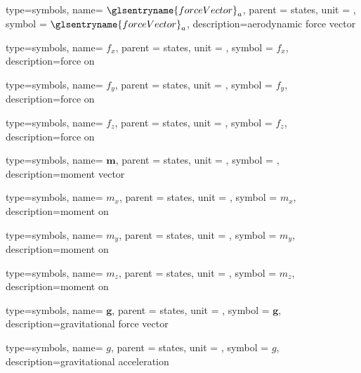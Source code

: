 {type=symbols,
  name= \ensuremath{{\glsentryname{forceVector}}_{a}},
  parent = {states},
  unit = \unexpanded{},
  symbol = \ensuremath{{\glsentryname{forceVector}}_{a}},
  description={aerodynamic force vector}
}

{type=symbols,
  name= \ensuremath{f_{x}},
  parent = {states},
  unit = \unexpanded{\si{\newton}},
  symbol = \ensuremath{f_{x}},
  description={force on }
}

{type=symbols,
  name= \ensuremath{f_{y}},
  parent = {states},
  unit = \unexpanded{\si{\newton}},
  symbol = \ensuremath{f_{y}},
  description={force on }
}

{type=symbols,
  name= \ensuremath{f_{z}},
  parent = {states},
  unit = \unexpanded{\si{\newton}},
  symbol = \ensuremath{f_{z}},
  description={force on }
}


{type=symbols,
  name= \ensuremath{\mathbf{m}},
  parent = {states},
  unit = \unexpanded{},
  symbol = ,
  description={moment vector}
}

{type=symbols,
  name= \ensuremath{m_{x}},
  parent = {states},
  unit = \unexpanded{\si{\newton\meter}},
  symbol = \ensuremath{m_{x}},
  description={moment on }
}

{type=symbols,
  name= \ensuremath{m_{y}},
  parent = {states},
  unit = \unexpanded{\si{\newton\meter}},
  symbol = \ensuremath{m_{y}},
  description={moment on }
}

{type=symbols,
  name= \ensuremath{m_{z}},
  parent = {states},
  unit = \unexpanded{\si{\newton\meter}},
  symbol = \ensuremath{m_{z}},
  description={moment on }
}

{type=symbols,
  name= \ensuremath{\mathbf{g}},
  parent = {states},
  unit = \unexpanded{},
  symbol = \ensuremath{\mathbf{g}},
  description={gravitational force vector}
}

{type=symbols,
  name= \ensuremath{g},
  parent = {states},
  unit = \unexpanded{\si{\meter\per\second\squared}},
  symbol = \ensuremath{g},
  description={gravitational acceleration}
}

